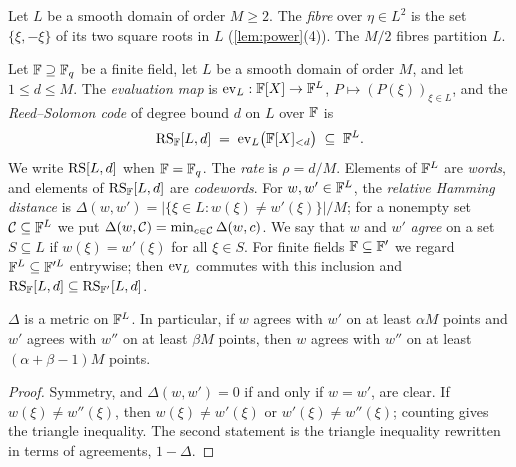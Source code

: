 \begin{definition}[Fibres]\label{def:fibre}
Let $L$ be a smooth domain of order $M \ge 2$. The \emph{fibre} over $\eta \in L^2$ is the set $\{\xi, -\xi\}$ of its two square roots in $L$ (\cref{lem:power}(4)).
The $M/2$ fibres partition $L$.
\end{definition}

\begin{definition}\label{def:rs}
Let $\mathbb{F} \supseteq \mathbb{F}_q$ be a finite field, let $L$ be a smooth domain of order $M$, and let $1 \le d \le M$.
The \emph{evaluation map} is $\mathrm{ev}_L : \mathbb{F}[X] \to \mathbb{F}^{L}$, $P \mapsto (P(\xi))_{\xi \in L}$, and the \emph{Reed--Solomon code} of degree bound $d$ on $L$ over $\mathbb{F}$ is
\[
  \mathrm{RS}_{\mathbb{F}}[L,d] \;=\; \mathrm{ev}_L\bigl(\mathbb{F}[X]_{<d}\bigr) \;\subseteq\; \mathbb{F}^{L}.
\]
We write $\mathrm{RS}[L,d]$ when $\mathbb{F} = \mathbb{F}_q$. The \emph{rate} is $\rho = d/M$.
Elements of $\mathbb{F}^L$ are \emph{words}, and elements of $\mathrm{RS}_{\mathbb{F}}[L,d]$ are \emph{codewords}.
For $w, w' \in \mathbb{F}^L$, the \emph{relative Hamming distance} is $\Delta(w,w') = |\{\xi \in L : w(\xi) \ne w'(\xi)\}|/M$; for a nonempty set $\mathcal{C} \subseteq \mathbb{F}^L$ we put $\Delta(w, \mathcal{C}) = \min_{c \in \mathcal{C}} \Delta(w,c)$.
We say that $w$ and $w'$ \emph{agree} on a set $S \subseteq L$ if $w(\xi) = w'(\xi)$ for all $\xi \in S$.
For finite fields $\mathbb{F} \subseteq \mathbb{F}'$ we regard $\mathbb{F}^L \subseteq \mathbb{F}'^L$ entrywise; then $\mathrm{ev}_L$ commutes with this inclusion and $\mathrm{RS}_{\mathbb{F}}[L,d] \subseteq \mathrm{RS}_{\mathbb{F}'}[L,d]$.
\end{definition}

\begin{lemma}\label{lem:metric}
$\Delta$ is a metric on $\mathbb{F}^L$. In particular, if $w$ agrees with $w'$ on at least $\alpha M$ points and $w'$ agrees with $w''$ on at least $\beta M$ points, then $w$ agrees with $w''$ on at least $(\alpha + \beta - 1)M$ points.
\end{lemma}

\begin{proof}
Symmetry, and $\Delta(w,w') = 0$ if and only if $w = w'$, are clear. If $w(\xi) \ne w''(\xi)$, then $w(\xi) \ne w'(\xi)$ or $w'(\xi) \ne w''(\xi)$; counting gives the triangle inequality. The second statement is the triangle inequality rewritten in terms of agreements, $1 - \Delta$.
\end{proof}

